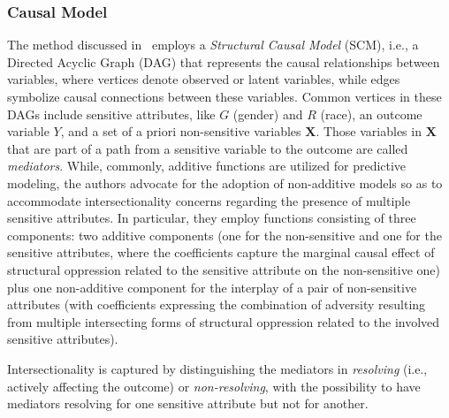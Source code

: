 \subsubsection{Causal Model}
\label{subsec:intrank_meth_inf_14n}

The method discussed in~\cite{yang2020causal} employs a \emph{Structural Causal Model} (SCM), i.e., a Directed Acyclic Graph (DAG) that represents the causal relationships between variables, where vertices denote observed or latent variables, while edges symbolize causal connections between these variables.
%
Common vertices in these DAGs include sensitive attributes, like $G$ (gender) and $R$ (race), an outcome variable $Y$, and a set of a priori non-sensitive variables $\mathbf{X}$. Those variables in $\mathbf{X}$ that are part of a path from a sensitive variable to the outcome are called \emph{mediators}.
While, commonly, additive functions are utilized for predictive modeling, the authors advocate for the adoption of non-additive models so as to accommodate intersectionality concerns regarding the presence of multiple sensitive attributes. In particular, they employ functions consisting of three components: two additive components (one for the non-sensitive and one for the sensitive attributes, where the coefficients capture the marginal causal effect of structural oppression related to the sensitive attribute on the non-sensitive one) plus one non-additive component for the interplay of a pair of non-sensitive attributes (with coefficients expressing the combination of adversity resulting from multiple intersecting forms of structural oppression related to the involved sensitive attributes).

Intersectionality is captured by distinguishing the mediators in \emph{resolving} (i.e., actively affecting the outcome) or \emph{non-resolving}, with the possibility to have mediators resolving for one sensitive attribute but not for another.




